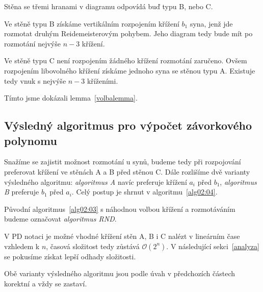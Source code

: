 Stěna se třemi hranami v diagramu odpovídá buď typu B, nebo C.

Ve stěně typu B získáme vertikálním rozpojením křížení $b_1$ syna, jenž jde rozmotat druhým Reidemeisterovým pohybem. Jeho diagram tedy bude mít po rozmotání nejvýše $n-3$ křížení.

Ve stěně typu C není rozpojením žádného křížení rozmotání zaručeno. Ovšem rozpojením libovolného křížení získáme jednoho syna se stěnou typu A. Existuje tedy vnuk s nejvýše $n-3$ kříženími.

Tímto jsme dokázali lemma~\ref{volbalemma}.

\subsection{Výsledný algoritmus pro výpočet závorkového polynomu} \label{varianty}
Snažíme se zajistit možnost rozmotání u synů, budeme tedy při rozpojování preferovat křížení ve stěnách A a B před stěnou C. Dále rozlišíme dvě varianty výsledného algoritmu: \emph{algoritmus A} navíc preferuje křížení $a_i$ před $b_1$,  \emph{algoritmus B} preferuje $b_1$ před $a_i$. Celý postup je shrnut v algoritmu~\ref{alg02:04}.

Původní algoritmus~\ref{alg02:03} s náhodnou volbou křížení a rozmotáváním budeme označovat \emph{algoritmus RND}.

V PD notaci je možné vhodné křížení stěn A, B i C nalézt v lineárním čase vzhledem k $n$, časová složitost tedy zůstává $\mathcal{O}(2^n)$. V následující sekci~\ref{analyza} se pokusíme získat lepší odhady složitosti.

Obě varianty výsledného algoritmu jsou podle úvah v předchozích částech korektní a vždy se zastaví.

